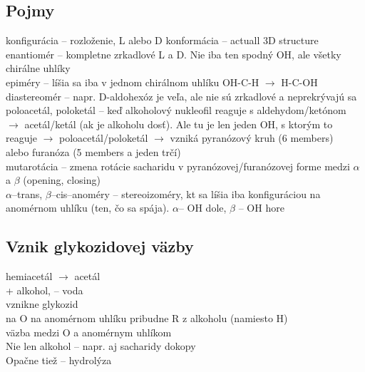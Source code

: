 \subsection{Pojmy}
konfigurácia -- rozloženie, L alebo D
konformácia -- actuall 3D structure
enantiomér -- kompletne zrkadlové L a D. Nie iba ten spodný OH, ale všetky chirálne uhlíky\\
epiméry -- líšia sa iba v jednom chirálnom uhlíku OH-C-H $\rightarrow$ H-C-OH\\
diastereomér -- napr. D-aldohexóz je veľa, ale nie sú zrkadlové a neprekrývajú sa\\
poloacetál, poloketál -- keď alkoholový nukleofil reaguje s aldehydom/ketónom $\rightarrow$ acetál/ketál (ak je alkoholu dosť). Ale tu je len jeden OH, s ktorým to reaguje $\rightarrow$  poloacetál/poloketál $\rightarrow$ 
\tab vzniká pyranózový kruh (6 members)\\
\tab alebo furanóza (5 members a jeden trčí)\\
mutarotácia -- zmena rotácie sacharidu v pyranózovej/furanózovej forme medzi $\alpha$ a $\beta$ (opening, closing)\\
$\alpha$--trans, $\beta$--cis--anoméry -- stereoizoméry, kt sa líšia iba konfiguráciou na anomérnom uhlíku (ten, čo sa spája). $\alpha$-- OH dole, $\beta$ -- OH hore\\

\subsection{Vznik glykozidovej väzby}
hemiacetál $\rightarrow$ acetál\\
+ alkohol, -- voda\\
vznikne glykozid\\
na O na anomérnom uhlíku pribudne R z alkoholu (namiesto H)\\
väzba medzi O a anomérnym uhlíkom\\
Nie len alkohol -- napr. aj sacharidy dokopy\\
Opačne tiež -- hydrolýza\\
